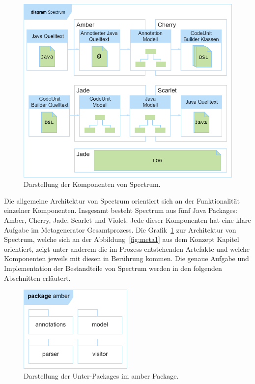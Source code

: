 \documentclass[12pt,oneside,a4paper,parskip]{scrbook}
\begin{document}
\begin{figure}[htbp]
	\centering
	\includegraphics[width=1.0\textwidth]{bilder/spectrumPackages}
	\caption{Darstellung der Komponenten von Spectrum.}
	\label{fig:spectrumPackages}
\end{figure}

Die allgemeine Architektur von Spectrum orientiert sich an der Funktionalität einzelner Komponenten. Insgesamt besteht Spectrum aus fünf Java Packages: Amber, Cherry, Jade, Scarlet und Violet. Jede dieser Komponenten hat eine klare Aufgabe im Metagenerator Gesamtprozess. Die Grafik~\ref{fig:spectrumPackages} zur Architektur von Spectrum, welche sich an der Abbildung~\ref{fig:meta1} aus dem Konzept Kapitel orientiert, zeigt unter anderem die im Prozess entstehenden Artefakte und welche Komponenten jeweils mit diesen in Berührung kommen. Die genaue Aufgabe und Implementation der Bestandteile von Spectrum werden in den folgenden Abschnitten erläutert.

\begin{figure}[htbp]
	\centering
	\includegraphics[width=0.5\textwidth]{bilder/amber}
	\caption{Darstellung der Unter-Packages im amber Package.}
	\label{fig:amberPackages}
\end{figure}
\end{document}

